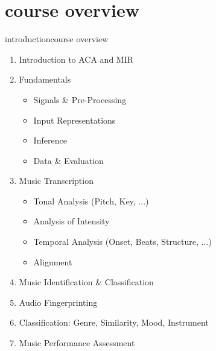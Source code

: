     \section[course overview]{course overview}
        \begin{frame}{introduction}{course overview}
            \begin{enumerate}
                \item   Introduction to ACA and MIR
                \item   Fundamentals
                    \begin{itemize}
                        \item   Signals \& Pre-Processing
                        \item   Input Representations
                        \item   Inference
                        \item   Data \& Evaluation
                    \end{itemize}
                \item   Music Transcription
                    \begin{itemize}
                        \item   Tonal Analysis (Pitch, Key, ...)
                        \item   Analysis of Intensity
                        \item   Temporal Analysis (Onset, Beats, Structure, ...)
                        \item   Alignment
                    \end{itemize}
                \item   Music Identification \& Classification
                \item    Audio Fingerprinting
                \item   Classification: Genre, Similarity, Mood, Instrument
                \item   Music Performance Assessment
            \end{enumerate}
        \end{frame}
        
